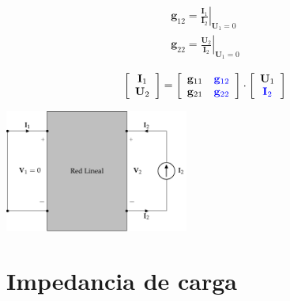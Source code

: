 \documentclass[10pt]{article}
\begin{document}
\begin{minipage}{0.5\textwidth}
  \[
    \begin{array}{c}
      \mathbf{g}_{12} = \left.\frac{\mathbf{I}_1}{\mathbf{I}_2}\right\rvert_{\mathbf{U}_1 = 0}\\
      \mathbf{g}_{22} = \left.\frac{\mathbf{U}_2}{\mathbf{I}_2}\right\rvert_{\mathbf{U}_1 = 0}
    \end{array}
  \]

  \[
    \left[
      \begin{array}{c}
        \mathbf{I}_1\\
        \mathbf{U}_2
      \end{array}
    \right] =
    \left[
      \begin{array}{cc}
        \mathbf{g}_{11} & \color{blue}{\mathbf{g}_{12}}\\
        \mathbf{g}_{21} & \color{blue}{\mathbf{g}_{22}}
      \end{array}
    \right] \cdot
    \left[
      \begin{array}{c}
        \mathbf{U}_1\\
        \color{blue}{\mathbf{I}_2}
      \end{array}
    \right]
  \]
\end{minipage}
\begin{minipage}{0.5\textwidth}
  \begin{center}
    \includegraphics[height=4cm]{../figs/parametrosG_salida.pdf}
  \end{center}
\end{minipage}

\section{Impedancia de carga}
\end{document}
